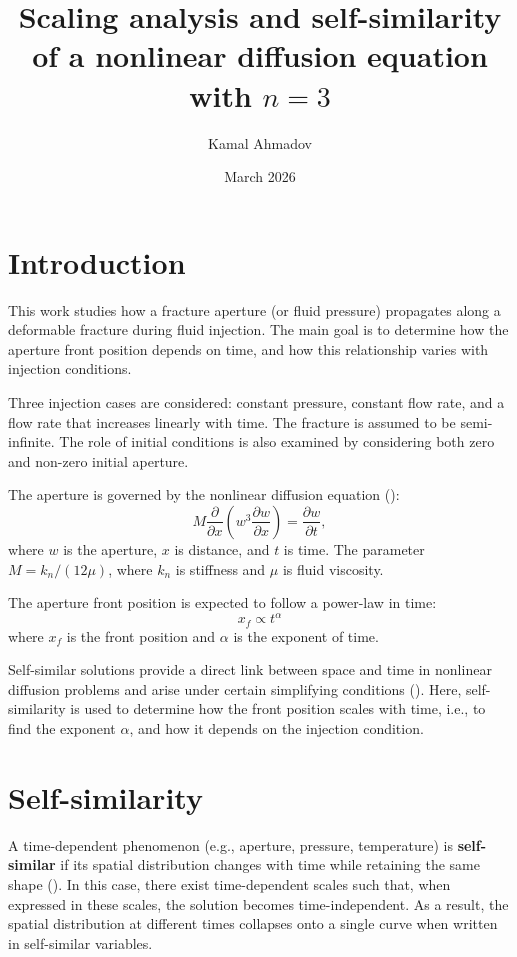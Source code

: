 \documentclass[12pt]{article}
\title{Scaling analysis and self-similarity of a nonlinear diffusion equation with $n=3$}
\author{Kamal Ahmadov}
\date{March 2026}
\begin{document}
\maketitle

\section{Introduction}

This work studies how a fracture aperture (or fluid pressure) propagates along a deformable fracture during fluid injection. The main goal is to determine how the aperture front position depends on time, and how this relationship varies with injection conditions.

Three injection cases are considered: constant pressure, constant flow rate, and a flow rate that increases linearly with time. The fracture is assumed to be semi-infinite. The role of initial conditions is also examined by considering both zero and non-zero initial aperture.

The aperture is governed by the nonlinear diffusion equation (\cite{MurphyEtAl2004}):
\begin{equation}
	M \frac{\partial}{\partial x} \left( w^3 \frac{\partial w}{\partial x} \right) = \frac{\partial w}{\partial t},
	\label{eq:nonlinear-diffusion-equation}
\end{equation}
where $w$ is the aperture, $x$ is distance, and $t$ is time. The parameter $M = k_n / (12\mu)$, where $k_n$ is stiffness and $\mu$ is fluid viscosity.

The aperture front position is expected to follow a power-law in time:
\begin{equation}
	x_f \propto t^{\alpha}
	\label{eq:power-law}
\end{equation}
where $x_f$ is the front position and $\alpha$ is the exponent of time.

Self-similar solutions provide a direct link between space and time in nonlinear diffusion problems and arise under certain simplifying conditions (\cite{Barenblatt1996}). Here, self-similarity is used to determine how the front position scales with time, i.e., to find the exponent $\alpha$, and how it depends on the injection condition.

\section{Self-similarity}

A time-dependent phenomenon (e.g., aperture, pressure, temperature) is \textbf{self-similar} if its spatial distribution changes with time while retaining the same shape (\cite{Barenblatt1996}). In this case, there exist time-dependent scales such that, when expressed in these scales, the solution becomes time-independent. As a result, the spatial distribution at different times collapses onto a single curve when written in self-similar variables.
\end{document}
